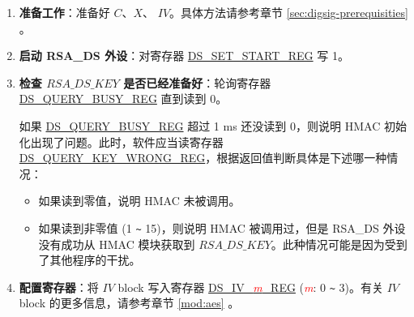 \documentclass[main\_\_CN.tex]{subfiles}
\begin{document}
\begin{enumerate}
    
    \item {\bfseries 准备工作}：准备好 \begin{math}C\end{math}、\begin{math}X\end{math}、 \begin{math}IV\end{math}。具体方法请参考章节 \ref{sec:digsig-prerequisities} 。
    
    \item {\bfseries 启动 RSA\_DS 外设}：对寄存器 \hyperref[regdesc:DSSETSTARTREG]{DS\_SET\_START\_REG} 写 1。
    
    \item {\bfseries 检查 \begin{math}RSA\_DS\_KEY\end{math} 是否已经准备好}：轮询寄存器 \hyperref[regdesc:DSQUERYBUSYREG]{DS\_QUERY\_BUSY\_REG} 直到读到 0。
    
    如果 \hyperref[regdesc:DSQUERYBUSYREG]{DS\_QUERY\_BUSY\_REG} 超过 1 ms 还没读到 0，则说明 HMAC 初始化出现了问题。此时，软件应当读寄存器 \hyperref[regdesc:DSQUERYKEYWRONGREG]{DS\_QUERY\_KEY\_WRONG\_REG}，根据返回值判断具体是下述哪一种情况：
    \begin{itemize}
    
        \item 如果读到零值，说明 HMAC 未被调用。
        
        \item 如果读到非零值 (1 \verb+~+ 15)，则说明 HMAC 被调用过，但是 RSA\_DS 外设没有成功从 HMAC 模块获取到 \begin{math}RSA\_DS\_KEY\end{math}。此种情况可能是因为受到了其他程序的干扰。
        
    \end{itemize}
    
    \item {\bfseries 配置寄存器}：将 \begin{math}IV\end{math} block 写入寄存器 \hyperref[regdesc:DSIVREG]{DS\_IV\_\textcolor{red}{\it{m}}\_REG} (\textcolor{red}{\it{m}}: 0 \verb+~+ 3)。有关 \begin{math}IV\end{math} block 的更多信息，请参考章节 \ref{mod:aes} \textit{}。


\end{enumerate}
\end{document}
